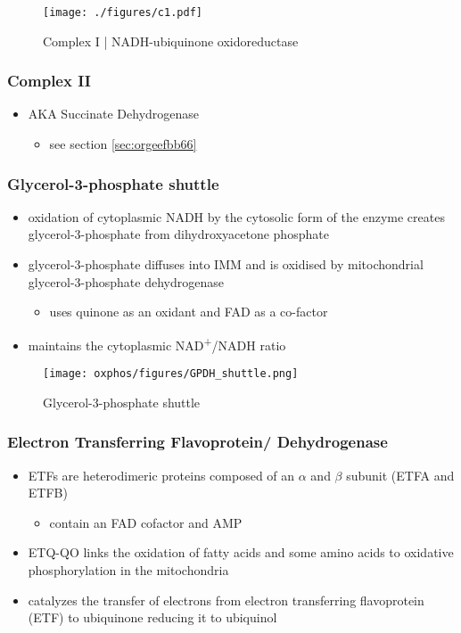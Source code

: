 \documentclass{scrartcl}
\begin{document}
\begin{figure}[htbp]
\centering
\texttt{[image: ./figures/c1.pdf]}
\caption[c1]{\label{fig:orgaa79c2f}Complex I | NADH-ubiquinone oxidoreductase}
\end{figure}

\subsubsection{Complex II}
\label{sec:org19bfe9b}
\begin{itemize}
\item AKA Succinate Dehydrogenase 
\begin{itemize}
\item see section \ref{sec:orgeefbb66}
\end{itemize}
\end{itemize}

\subsubsection{Glycerol-3-phosphate shuttle}
\label{sec:org6b8c40b}
\begin{itemize}
\item oxidation of cytoplasmic NADH by the cytosolic form of the enzyme
creates glycerol-3-phosphate from dihydroxyacetone phosphate
\item glycerol-3-phosphate diffuses into IMM and is oxidised by mitochondrial glycerol-3-phosphate dehydrogenase
\begin{itemize}
\item uses quinone as an oxidant and FAD as a co-factor
\end{itemize}
\item maintains the cytoplasmic NAD\textsuperscript{+}/NADH ratio
\end{itemize}

\begin{figure}[htbp]
\centering
\texttt{[image: oxphos/figures/GPDH\_shuttle.png]}
\caption[g3ps]{\label{fig:org610a135}Glycerol-3-phosphate shuttle}
\end{figure}

\subsubsection{Electron Transferring Flavoprotein/ Dehydrogenase}
\label{sec:org6e4e0ff}
\begin{itemize}
\item ETFs are heterodimeric proteins composed of an \(\alpha\) and \(\beta\)
subunit (ETFA and ETFB)
\begin{itemize}
\item contain an FAD cofactor and AMP
\end{itemize}
\item ETQ-QO links the oxidation of fatty acids and some amino acids to
oxidative phosphorylation in the mitochondria
\item catalyzes the transfer of electrons from electron transferring
flavoprotein (ETF) to ubiquinone reducing it to ubiquinol
\end{itemize}
\end{document}
